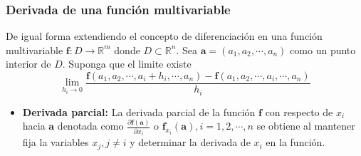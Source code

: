 \subsubsection{Derivada de una función multivariable}
De igual forma extendiendo el concepto de diferenciación en una función multivariable $\mathbf{f:} D \rightarrow \mathbb{R}^m$ donde $D \subset \mathbb{R}^n$. Sea $\mathbf{a}=({a}_{1}, {a}_{2}, \cdots , {a}_{n})$ como un punto interior de $D$. Suponga que el limite existe
$$
\lim_{{h}_{i} \to 0} \frac{\mathbf{f}({a}_{1}, {a}_{2}, \cdots , {a}_{i} + {h}_{i}, \cdots , {a}_{n}) - \mathbf{f} ({a}_{1}, {a}_{2}, \cdots , {a}_{i}, \cdots , {a}_{n})}{{h}_{i}}
$$
\begin{itemize}
  \item \textbf{Derivada parcial:} La derivada parcial de la función $\mathbf{f}$ con respecto de ${x}_{i}$ hacia $\mathbf{a}$ denotada como $\frac{\partial \mathbf{f(a)}}{\partial {x}_{i}}$ o ${\mathbf{f}}_{x_i} \mathbf{(a)}, i = 1, 2, \cdots , n$ se obtiene al mantener fija la variables $x_j, j \neq i$ y determinar la derivada de $x_i$ en la función.

\end{itemize}
